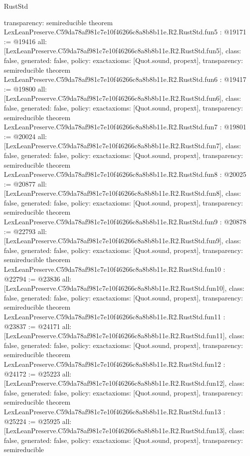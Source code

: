 \begin{lexlean}{RustStd}
\begin{coremodule}
{  transparency: semireducible
}
theorem LexLeanPreserve.C59da78af981c7e10f46266c8a8b8b11e.R2.RustStd.fun5 : @19171 := @19416 {
  all: [LexLeanPreserve.C59da78af981c7e10f46266c8a8b8b11e.R2.RustStd.fun5],
  class: false,
  generated: false,
  policy: exact{axioms: [Quot.sound, propext]},
  transparency: semireducible
}
theorem LexLeanPreserve.C59da78af981c7e10f46266c8a8b8b11e.R2.RustStd.fun6 : @19417 := @19800 {
  all: [LexLeanPreserve.C59da78af981c7e10f46266c8a8b8b11e.R2.RustStd.fun6],
  class: false,
  generated: false,
  policy: exact{axioms: [Quot.sound, propext]},
  transparency: semireducible
}
theorem LexLeanPreserve.C59da78af981c7e10f46266c8a8b8b11e.R2.RustStd.fun7 : @19801 := @20024 {
  all: [LexLeanPreserve.C59da78af981c7e10f46266c8a8b8b11e.R2.RustStd.fun7],
  class: false,
  generated: false,
  policy: exact{axioms: [Quot.sound, propext]},
  transparency: semireducible
}
theorem LexLeanPreserve.C59da78af981c7e10f46266c8a8b8b11e.R2.RustStd.fun8 : @20025 := @20877 {
  all: [LexLeanPreserve.C59da78af981c7e10f46266c8a8b8b11e.R2.RustStd.fun8],
  class: false,
  generated: false,
  policy: exact{axioms: [Quot.sound, propext]},
  transparency: semireducible
}
theorem LexLeanPreserve.C59da78af981c7e10f46266c8a8b8b11e.R2.RustStd.fun9 : @20878 := @22793 {
  all: [LexLeanPreserve.C59da78af981c7e10f46266c8a8b8b11e.R2.RustStd.fun9],
  class: false,
  generated: false,
  policy: exact{axioms: [Quot.sound, propext]},
  transparency: semireducible
}
theorem LexLeanPreserve.C59da78af981c7e10f46266c8a8b8b11e.R2.RustStd.fun10 : @22794 := @23836 {
  all: [LexLeanPreserve.C59da78af981c7e10f46266c8a8b8b11e.R2.RustStd.fun10],
  class: false,
  generated: false,
  policy: exact{axioms: [Quot.sound, propext]},
  transparency: semireducible
}
theorem LexLeanPreserve.C59da78af981c7e10f46266c8a8b8b11e.R2.RustStd.fun11 : @23837 := @24171 {
  all: [LexLeanPreserve.C59da78af981c7e10f46266c8a8b8b11e.R2.RustStd.fun11],
  class: false,
  generated: false,
  policy: exact{axioms: [Quot.sound, propext]},
  transparency: semireducible
}
theorem LexLeanPreserve.C59da78af981c7e10f46266c8a8b8b11e.R2.RustStd.fun12 : @24172 := @25223 {
  all: [LexLeanPreserve.C59da78af981c7e10f46266c8a8b8b11e.R2.RustStd.fun12],
  class: false,
  generated: false,
  policy: exact{axioms: [Quot.sound, propext]},
  transparency: semireducible
}
theorem LexLeanPreserve.C59da78af981c7e10f46266c8a8b8b11e.R2.RustStd.fun13 : @25224 := @25925 {
  all: [LexLeanPreserve.C59da78af981c7e10f46266c8a8b8b11e.R2.RustStd.fun13],
  class: false,
  generated: false,
  policy: exact{axioms: [Quot.sound, propext]},
  transparency: semireducible
}
\end{coremodule}
\end{lexlean}
